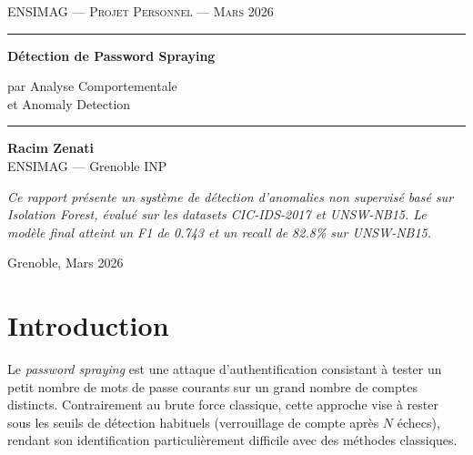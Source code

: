 \documentclass[11pt,a4paper]{article}
\begin{document}
\begin{titlepage}
\centering
\vspace*{2cm}

{\small\textcolor{medgray}{\textsc{ENSIMAG --- Projet Personnel --- Mars 2026}}}

\vspace{1.5cm}
\textcolor{lightgray}{\rule{0.6\linewidth}{0.5pt}}
\vspace{1cm}

{\LARGE\bfseries\color{darkgray} Détection de Password Spraying}

\vspace{0.6cm}

{\large\color{medgray} par Analyse Comportementale\\[0.3em] et Anomaly Detection}

\vspace{1cm}
\textcolor{lightgray}{\rule{0.6\linewidth}{0.5pt}}

\vspace{2.5cm}

{\normalsize\color{darkgray} \textbf{Racim Zenati}}\\[0.4em]
{\small\color{medgray} ENSIMAG --- Grenoble INP}

\vspace{3cm}

\begin{minipage}{0.75\linewidth}
\small\color{medgray}
\textit{Ce rapport présente un système de détection d'anomalies non supervisé
basé sur Isolation Forest, évalué sur les datasets CIC-IDS-2017 et UNSW-NB15.
Le modèle final atteint un F1 de 0.743 et un recall de 82.8\% sur UNSW-NB15.}
\end{minipage}

\vfill
{\small\textcolor{medgray}{Grenoble, Mars 2026}}
\restoregeometry
\end{titlepage}

\thispagestyle{empty}
\tableofcontents
\newpage

\section{Introduction}

Le \textit{password spraying} est une attaque d'authentification consistant à
tester un petit nombre de mots de passe courants sur un grand nombre de comptes
distincts. Contrairement au brute force classique, cette approche vise à rester
sous les seuils de détection habituels (verrouillage de compte après $N$ échecs),
rendant son identification particulièrement difficile avec des méthodes classiques.
\end{document}
